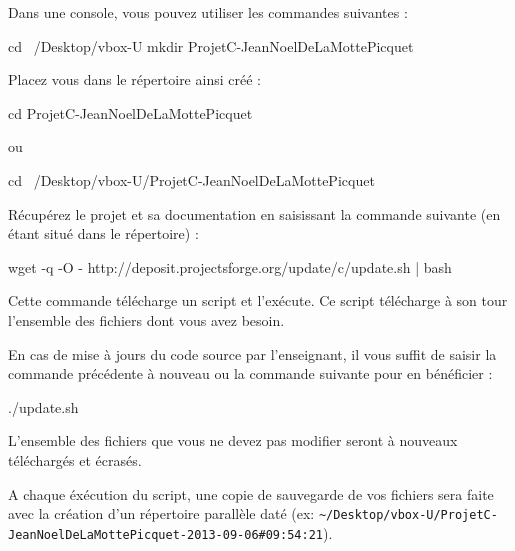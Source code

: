 Dans une console, vous pouvez utiliser les commandes suivantes :
\begin{bashsource}
cd ~/Desktop/vbox-U
mkdir ProjetC-JeanNoelDeLaMottePicquet
\end{bashsource}
    
Placez vous dans le répertoire ainsi créé :
\begin{bashsource}
cd ProjetC-JeanNoelDeLaMottePicquet
\end{bashsource}
ou
\begin{bashsource}
cd ~/Desktop/vbox-U/ProjetC-JeanNoelDeLaMottePicquet
\end{bashsource}

Récupérez le projet et sa documentation en saisissant la commande suivante (en étant situé dans le répertoire) :
\begin{bashsource}
wget -q -O - http://deposit.projectsforge.org/update/c/update.sh | bash
\end{bashsource}
Cette commande télécharge un script et l'exécute. Ce script télécharge à son tour l'ensemble des fichiers dont vous avez besoin.

\begin{tipsandhints}
En cas de mise à jours du code source par l'enseignant, il vous suffit de saisir
la commande précédente à nouveau ou la commande suivante pour en bénéficier :
\begin{bashsource}
./update.sh   
\end{bashsource}
L'ensemble des fichiers que vous ne devez pas modifier seront à nouveaux téléchargés et écrasés.
\end{tipsandhints}

\begin{warning}
A chaque éxécution du script, une copie de sauvegarde de vos fichiers sera faite avec la création d'un répertoire parallèle daté (ex: \verb'~/Desktop/vbox-U/ProjetC-JeanNoelDeLaMottePicquet-2013-09-06#09:54:21').
\end{warning}

